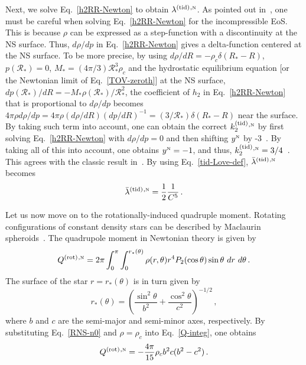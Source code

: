 \documentclass[aps,twocolumn,nofootinbib,showpacs,superscriptaddress,hyperref]{revtex4-1}
\newcommand\be{\begin{equation}}
\newcommand\ee{\end{equation}}
\newcommand{\NS}{*}
\newcommand{\RNS}{\mathcal{R}_*}
\newcommand{\tid}{\mathrm{(tid)}}
\newcommand{\rot}{\mathrm{(rot)}}
\newcommand{\N}{{\mbox{\tiny N}}}
\begin{document}
Next, we solve Eq.~\eqref{h2RR-Newton} to obtain $\lambda^\tid{}^{,\N}$. As pointed out in~\cite{damour-nagar}, one must be careful when solving Eq.~\eqref{h2RR-Newton} for the incompressible EoS. This is because $\rho$ can be expressed as a step-function with a discontinuity at the NS surface. Thus, $d\rho/dp$ in Eq.~\eqref{h2RR-Newton} gives a delta-function centered at the NS surface. To be more precise, by using $d\rho/dR = - \rho_c \delta (R_\NS-R)$, $p(\RNS)=0$, $M_\NS=(4\pi/3) \RNS^3 \rho_c$ and the hydrostatic equilibrium equation [or the Newtonian limit of Eq.~\eqref{TOV-zeroth}] at the NS surface, $dp(\RNS)/dR = -M_\NS \rho(\RNS)/\RNS^2$, the coefficient of $h_2$ in Eq.~\eqref{h2RR-Newton} that is proportional to $d\rho/dp$ becomes $4\pi \rho d\rho/dp = 4\pi \rho (d\rho/dR) (dp/dR)^{-1} = (3/\RNS) \delta (R_{\NS}-R)$ near the surface. By taking such term into account, one can obtain the correct $k_2^\tid{}^{,\N}$ by first solving Eq.~\eqref{h2RR-Newton} with $d\rho/dp=0$ and then shifting $y^\N$ by -3~\cite{damour-nagar}. By taking all of this into account, one obtains $y^\N = -1$, and thus, $k_2^\tid{}^{,\N} = 3/4$~\cite{damour-nagar}. This agrees with the classic result in~\cite{brooker-olle}. By using Eq.~\eqref{tid-Love-def}, $\bar{\lambda}^\tid{}^{,\N}$ becomes
%
\be
\bar{\lambda}^\tid{}^{,\N} = \frac{1}{2}\frac{1}{C^5}\,.
\label{lambda-bar-n0}
\ee
%

Let us now move on to the rotationally-induced quadruple moment. Rotating configurations of constant density stars can be described by Maclaurin spheroids~\cite{shapiro-teukolsky}. The quadrupole moment in Newtonian theory is given by~\cite{laarakkers}
%
\be
Q^\rot{}^{,\N} = 2\pi \int_0^{\pi} \int_0^{r_* (\theta)} \rho(r,\theta) r^4 P_2 (\cos \theta) \sin \theta \ dr \ d\theta\,. 
\label{Q-integ}
\ee
%
The surface of the star $r=r_* (\theta)$ is in turn given by
%
\be
r_* (\theta) = \left( \frac{\sin^2\theta}{b^2} + \frac{\cos^2\theta}{c^2} \right)^{-1/2}\,,
\label{RNS-n0}
\ee
%
where $b$ and $c$ are the semi-major and semi-minor axes, respectively. By substituting Eq.~\eqref{RNS-n0} and $\rho=\rho_c$ into Eq.~\eqref{Q-integ}, one obtains
%
\be
Q^\rot{}^{,\N} = -\frac{4\pi}{15} \rho_c b^2 c (b^2-c^2)\,.
\label{Q-n0}
\ee
%
\end{document}
